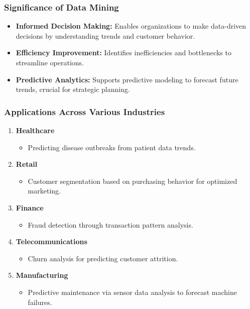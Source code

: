 \documentclass[aspectratio=169]{beamer}
\begin{document}
\begin{frame}[fragile]
    \frametitle{Significance of Data Mining}
    \begin{itemize}
        \item \textbf{Informed Decision Making:} Enables organizations to make data-driven decisions by understanding trends and customer behavior.
        
        \item \textbf{Efficiency Improvement:} Identifies inefficiencies and bottlenecks to streamline operations.
        
        \item \textbf{Predictive Analytics:} Supports predictive modeling to forecast future trends, crucial for strategic planning.
    \end{itemize}
\end{frame}

\begin{frame}[fragile]
    \frametitle{Applications Across Various Industries}
    \begin{enumerate}
        \item \textbf{Healthcare}
            \begin{itemize}
                \item Predicting disease outbreaks from patient data trends.
            \end{itemize}
            
        \item \textbf{Retail}
            \begin{itemize}
                \item Customer segmentation based on purchasing behavior for optimized marketing.
            \end{itemize}
            
        \item \textbf{Finance}
            \begin{itemize}
                \item Fraud detection through transaction pattern analysis.
            \end{itemize}
            
        \item \textbf{Telecommunications}
            \begin{itemize}
                \item Churn analysis for predicting customer attrition.
            \end{itemize}
            
        \item \textbf{Manufacturing}
            \begin{itemize}
                \item Predictive maintenance via sensor data analysis to forecast machine failures.
            \end{itemize}
    \end{enumerate}
\end{frame}
\end{document}
